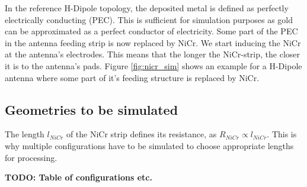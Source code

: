 In the reference H-Dipole topology, the deposited metal is defined as perfectly electrically conducting (PEC). This is sufficient for simulation purposes as gold can be approximated as a perfect conductor of electricity. Some part of the PEC in the antenna feeding strip is now replaced by NiCr. We start inducing the NiCr at the antenna's electrodes. This means that the longer the NiCr-strip, the closer it is to the antenna's pads. Figure \ref{fig:nicr_sim} shows an example for a H-Dipole antenna where some part of it's feeding structure is replaced by NiCr. 



\subsection{Geometries to be simulated}
The length $l_{NiCr}$ of the NiCr strip defines its resistance, as $R_{NiCr} \propto l_{NiCr}$. This is why multiple configurations have to be simulated to choose appropriate lengths for processing. 

\textbf{TODO: Table of configurations etc.}

